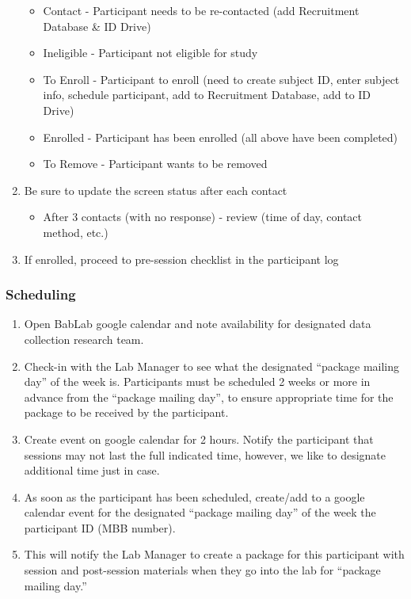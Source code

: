 \documentclass[]{book}
\providecommand{\tightlist}{%
  \setlength{\itemsep}{0pt}\setlength{\parskip}{0pt}}
\begin{document}
\begin{enumerate}
  \begin{itemize}
  \tightlist
  \item
    Contact - Participant needs to be re-contacted (add Recruitment Database \& ID Drive)
  \item
    Ineligible - Participant not eligible for study
  \item
    To Enroll - Participant to enroll (need to create subject ID, enter subject info, schedule participant, add to Recruitment Database, add to ID Drive)
  \item
    Enrolled - Participant has been enrolled (all above have been completed)
  \item
    To Remove - Participant wants to be removed
  \end{itemize}
\item
  Be sure to update the screen status after each contact

  \begin{itemize}
  \tightlist
  \item
    After 3 contacts (with no response) - review (time of day, contact method, etc.)
  \end{itemize}
\item
  If enrolled, proceed to pre-session checklist in the participant log
\end{enumerate}

\hypertarget{scheduling}{%
\subsubsection{Scheduling}\label{scheduling}}

\begin{enumerate}
\def\labelenumi{\arabic{enumi}.}
\tightlist
\item
  Open BabLab google calendar and note availability for designated data collection research team.
\item
  Check-in with the Lab Manager to see what the designated ``package mailing day'' of the week is.
  Participants must be scheduled 2 weeks or more in advance from the ``package mailing day'', to ensure appropriate time for the package to be received by the participant.
\item
  Create event on google calendar for 2 hours. Notify the participant that sessions may not last the full indicated time, however, we like to designate additional time just in case.
\item
  As soon as the participant has been scheduled, create/add to a google calendar event for the designated ``package mailing day'' of the week the participant ID (MBB number).
\item
  This will notify the Lab Manager to create a package for this participant with session and post-session materials when they go into the lab for ``package mailing day.''
\end{enumerate}
\end{document}
